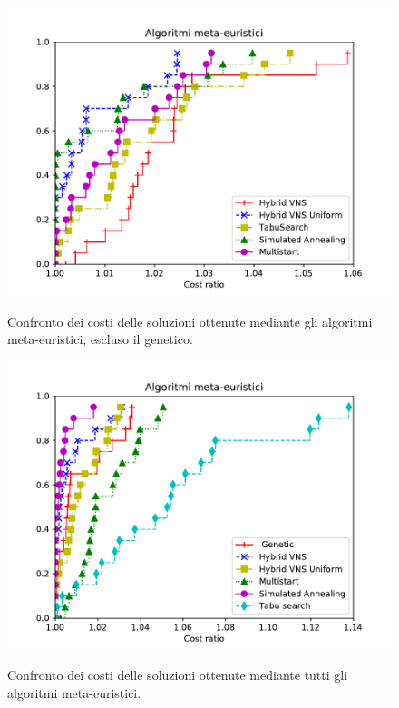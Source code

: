 \begin{figure}[h] 
\begin{center} 
  \includegraphics[scale=0.8]{Images/pp_heuristic}\\ 
  \caption{\footnotesize{Confronto dei costi delle soluzioni ottenute mediante gli algoritmi meta-euristici, escluso il genetico.}}
  \label{pp_heuristic} 
\end{center}
\end{figure}
\begin{figure}[h] 
\begin{center} 
  \includegraphics[scale=0.8]{Images/pp_genetic}\\ 
  \caption{\footnotesize{Confronto dei costi delle soluzioni ottenute mediante tutti gli algoritmi meta-euristici.}}
  \label{pp_genetic} 
\end{center} 
\end{figure}
